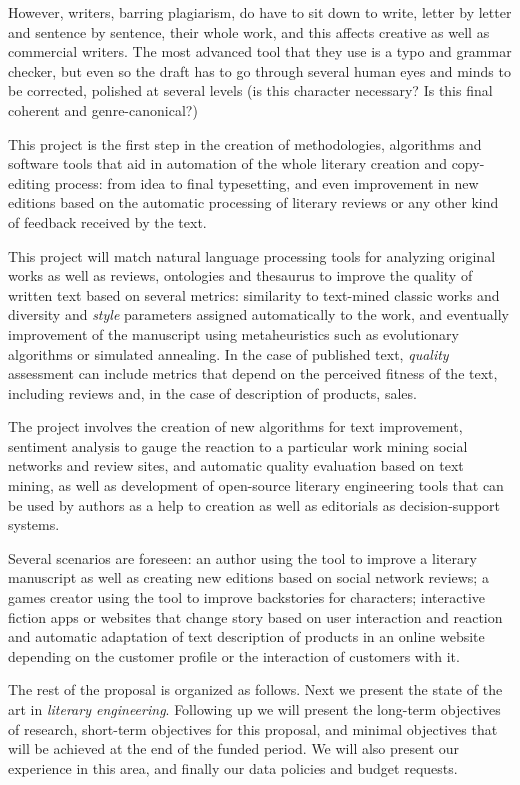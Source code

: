 \documentclass[a4paper,12pt,twocolumn]{article}
\begin{document}
However, writers, barring plagiarism, do have to sit down to write,
letter by letter and sentence by sentence, their whole work, and this
affects creative as well as commercial writers. The most advanced tool
that they use is a typo and grammar checker, but even so the draft has
to go through several human eyes and minds to be corrected, polished
at several levels (is this character necessary? Is this final coherent
and genre-canonical?)

This project is the first step in the creation of methodologies, algorithms and
software tools that aid in automation of the whole literary creation and
copy-editing process: from idea to final typesetting, and even improvement in new editions
based on the automatic processing of literary reviews or any other
kind of feedback received by the text.

This project will match natural language processing tools for
analyzing original works as well as reviews, ontologies and thesaurus
to improve the quality of written text based on several metrics: similarity to
text-mined classic works and diversity and {\em style} parameters
assigned automatically to the work, and eventually improvement of the
manuscript using metaheuristics such as evolutionary algorithms or
simulated annealing. In the case of published text, {\em quality}
assessment can include metrics that depend on the perceived fitness of
the text, including reviews and, in the case of description of
products, sales.

The project involves the creation of new algorithms for text
improvement, sentiment analysis to gauge the reaction to a particular
work mining social networks and review sites, and automatic quality
evaluation based on text mining, as well as development of open-source
literary engineering tools that can be used by authors as a help to
creation as well as editorials as decision-support systems.  

Several scenarios are foreseen: an author using the tool to improve a
literary manuscript as well as creating new editions based on social
network reviews; a games creator using the tool to improve backstories
for characters; interactive fiction apps or websites that change story
based on user interaction and reaction and automatic adaptation of
text description of products in an online website depending on the
customer profile or the interaction of customers with it. 

The rest of the proposal is organized as follows. Next we present the
state of the art in {\em literary engineering}. Following up we will
present the long-term objectives of research, short-term objectives
for this proposal, and minimal objectives that will be achieved at the
end of the funded period. We will also present our experience in this
area, and finally our data policies and budget requests.
\end{document}
